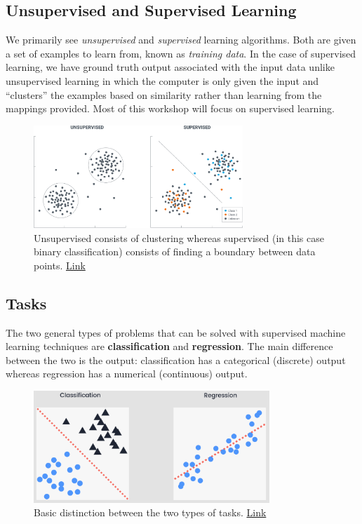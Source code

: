 \documentclass{article}
\begin{document}
\subsection{Unsupervised and Supervised Learning}
We primarily see \textit{unsupervised} and \textit{supervised} learning algorithms. Both are given a set of examples to learn from, known as \textit{training data}. In the case of supervised learning, we have ground truth output associated with the input data unlike unsupervised learning in which the computer is only given the input and ``clusters'' the examples based on similarity rather than learning from the mappings provided. Most of this workshop will focus on supervised learning. 
\begin{figure}[H]
    \centering
    \includegraphics[width=3.1in]{supervision.png}
    \caption{Unsupervised consists of clustering whereas supervised (in this case binary classification) consists of finding a boundary between data points. \href{https://chatbotsmagazine.com/lets-know-supervised-and-unsupervised-in-an-easy-way-9168363e06ab}{Link}}
    \label{fig:supervision}
\end{figure}

\newpage
\subsection{Tasks} 

The two general types of problems that can be solved with supervised machine learning techniques are \textbf{classification} and \textbf{regression}. The main difference between the two is the output: classification has a categorical (discrete) output whereas regression has a numerical (continuous) output. 

\begin{figure}[H]
    \centering
    \includegraphics[width=3.5in]{tasks.png}
    \caption{Basic distinction between the two types of tasks. \href{https://medium.com/datadriveninvestor/supervised-vs-unsupervised-machine-learning-5200ffa7301a}{Link}}
    \label{fig:tasks}
\end{figure}
\end{document}
